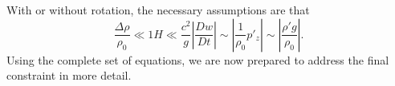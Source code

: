 \documentclass[letterpaper, 11pt]{article}
\begin{document}
With or without rotation, the necessary assumptions are that
\begin{subequations}
\begin{equation*}
\frac{\Delta \rho}{\rho_0} \ll 1
\end{equation*}
\begin{equation*}
H \ll \frac{c^2}{g}
\end{equation*}
\begin{equation*}
\left|\frac{D w}{D t}\right| \sim \left|\frac{1}{\rho_0} p'_z \right| \sim \left|\frac{\rho' g}{\rho_0}\right|.
\end{equation*}
\end{subequations}
Using the complete set of equations, we are now prepared to address the final constraint in more detail.

\end{document}
